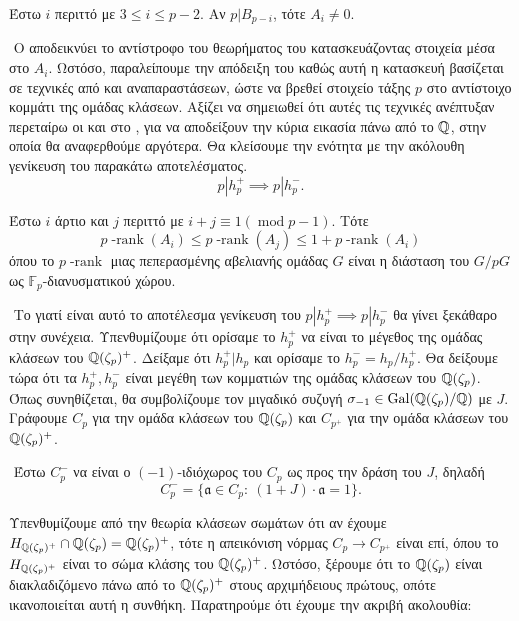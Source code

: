 \begin{theorem}[\tl{Ribet}] Έστω $i$ περιττό με $3\leq i \leq p-2$. Αν $p|B_{p-i}$, τότε $A_i\neq 0$.
\end{theorem}

$ $\newline
Ο  αποδεικνύει το αντίστροφο του θεωρήματος του  κατασκευάζοντας στοιχεία μέσα στο $A_i$. Ωστόσο, παραλείπουμε την απόδειξη του καθώς αυτή η κατασκευή 
βασίζεται σε τεχνικές από  και  αναπαραστάσεων, ώστε να βρεθεί στοιχείο τάξης $p$ στο αντίστοιχο 
κομμάτι της ομάδας κλάσεων. Αξίζει να σημειωθεί ότι αυτές τις τεχνικές ανέπτυξαν περεταίρω οι  και  στο \cite{MW}, για να αποδείξουν 
την κύρια εικασία  πάνω από το $\mathbb{Q}$, στην οποία θα αναφερθούμε αργότερα. Θα κλείσουμε την ενότητα με την ακόλουθη γενίκευση του παρακάτω αποτελέσματος.
$$p|h^+_p \implies p|h^-_p.$$ 

\begin{theorem}
	Έστω $i$ άρτιο και $j$ περιττό με $i+j \equiv 1 (\operatorname{mod}p-1)$. Τότε
	$$p\operatorname{-rank}(A_i) \leq p\operatorname{-rank}(A_j) \leq 1+ p\operatorname{-rank}(A_i)$$
	όπου το $p\operatorname{-rank}$ μιας πεπερασμένης αβελιανής ομάδας $G$ είναι η διάσταση του $G/pG$ ως $\mathbb{F}_p$-διανυσματικού χώρου.
\end{theorem}

$ $\newline
Το γιατί είναι αυτό το αποτέλεσμα γενίκευση του $p|h_p^+ \implies p|h^-_p$ θα γίνει ξεκάθαρο στην συνέχεια. Υπενθυμίζουμε ότι ορίσαμε 
το $h^+_p$ να είναι το μέγεθος της ομάδας κλάσεων του $\mathbb{Q}(\zeta_p)^+$. Δείξαμε ότι $h^+_p|h_p$ και ορίσαμε το $h^-_p = h_p/h^+_p$. 
Θα δείξουμε τώρα ότι τα $h_p^+, h_p^-$ είναι μεγέθη των κομματιών της ομάδας κλάσεων του $\mathbb{Q}(\zeta_p)$. Όπως συνηθίζεται, 
θα συμβολίζουμε τον μιγαδικό συζυγή $\sigma_{-1} \in \operatorname{Gal}(\mathbb{Q}(\zeta_p)/\mathbb{Q})$ με $J$. Γράφουμε $C_p$ για την ομάδα κλάσεων του 
$\mathbb{Q}(\zeta_p)$ και $C_{p^+}$ για την ομάδα κλάσεων του $\mathbb{Q}(\zeta_p)^+$.

$ $\newline
Έστω $C_p^-$ να είναι ο $(-1)$-ιδιόχωρος του $C_p$ ως προς την δράση του $J$, δηλαδή
$$C_p^- = \{ \mathfrak{a} \in C_p: \ (1+J) \cdot \mathfrak{a} = 1 \}.$$

\noindent Υπενθυμίζουμε από την θεωρία κλάσεων σωμάτων ότι αν έχουμε $H_{\mathbb{Q}(\zeta_p)^+}\cap \mathbb{Q}(\zeta_p) = \mathbb{Q}(\zeta_p)^+$, τότε η 
απεικόνιση νόρμας $C_p \longrightarrow C_{p^+}$ είναι επί, όπου το $H_{\mathbb{Q}(\zeta_p)^+}$ είναι το  σώμα κλάσης του 
$\mathbb{Q}(\zeta_p)^+$. Ωστόσο, ξέρουμε ότι το $\mathbb{Q}(\zeta_p)$ είναι διακλαδιζόμενο πάνω από το $\mathbb{Q}(\zeta_p)^+$ στους αρχιμήδειους πρώτους, οπότε ικανοποιείται αυτή η συνθήκη. Παρατηρούμε ότι έχουμε την ακριβή ακολουθία:

